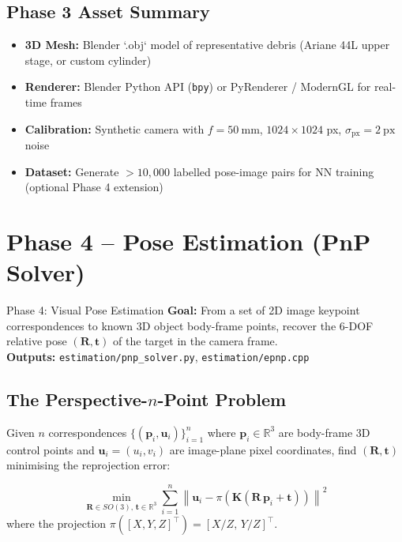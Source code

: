 \documentclass[12pt, a4paper]{article}
\begin{document}
\subsection{Phase 3 Asset Summary}
\begin{assetbox}[title=Phase 3 Assets]
\begin{itemize}[leftmargin=1.5em, itemsep=2pt]
    \item \textbf{3D Mesh:} Blender `.obj` model of representative debris
          (Ariane 44L upper stage, or custom cylinder)
    \item \textbf{Renderer:} Blender Python API (\texttt{bpy}) or
          PyRenderer / ModernGL for real-time frames
    \item \textbf{Calibration:} Synthetic camera with $f = 50\ \mathrm{mm}$,
          $1024 \times 1024$ px, $\sigma_{\mathrm{px}} = 2\ \mathrm{px}$ noise
    \item \textbf{Dataset:} Generate $> 10{,}000$ labelled pose-image pairs
          for NN training (optional Phase 4 extension)
\end{itemize}
\end{assetbox}

\section{Phase 4 -- Pose Estimation (PnP Solver)}

\begin{phasebox}{Phase 4: Visual Pose Estimation}
\textbf{Goal:} From a set of 2D image keypoint correspondences to known
3D object body-frame points, recover the 6-DOF relative pose
$(\mathbf{R}, \mathbf{t})$ of the target in the camera frame.\\[0.5em]
\textbf{Outputs:} \texttt{estimation/pnp\_solver.py},
\texttt{estimation/epnp.cpp}
\end{phasebox}

\subsection{The Perspective-$n$-Point Problem}

Given $n$ correspondences $\{(\mathbf{p}_i, \mathbf{u}_i)\}_{i=1}^n$
where $\mathbf{p}_i \in \mathbb{R}^3$ are body-frame 3D control points
and $\mathbf{u}_i = (u_i, v_i)$ are image-plane pixel coordinates, find
$(\mathbf{R}, \mathbf{t})$ minimising the reprojection error:

\begin{formulabox}[title=PnP Reprojection Objective]
\begin{equation}
\min_{\mathbf{R} \in SO(3),\, \mathbf{t} \in \mathbb{R}^3}
\sum_{i=1}^{n}
\left\|
\mathbf{u}_i -
\pi\!\left(\mathbf{K}\left(\mathbf{R}\,\mathbf{p}_i + \mathbf{t}\right)\right)
\right\|^2
\end{equation}
where the projection $\pi\!\left([X,Y,Z]^\top\right) = [X/Z,\, Y/Z]^\top$.
\end{formulabox}
\end{document}
